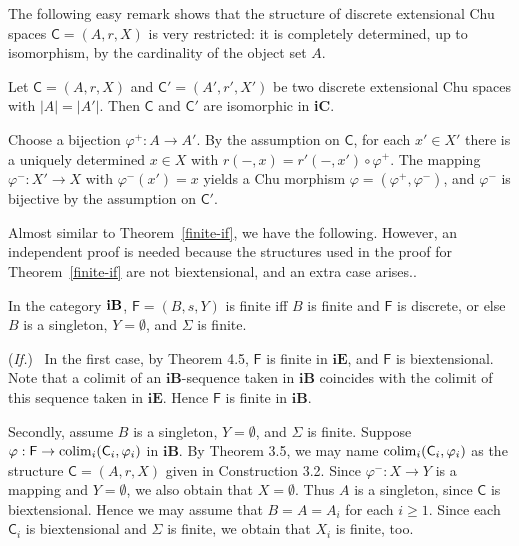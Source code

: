 \documentclass{LMCS}
\let\pf\proof
\let\epf\endproof
\begin{document}
The following easy remark shows that the structure of discrete
extensional Chu spaces $\mathsf{C} = (A,r,X)$ is very restricted: it
is completely determined,  up to isomorphism, by the cardinality of the
object set $A$. 

\begin{rem}\label{rem:complext-iso}
  Let $\mathsf{C} = (A,r,X)$ and $\mathsf{C}'=(A',r',X')$ be two
  discrete extensional Chu spaces with $|A|=|A'|$. Then $\mathsf{C}$ and
  $\mathsf{C}'$ are isomorphic in {\bf iC}. 
\end{rem}

\pf
Choose a bijection $\varphi^+:A \to A'$. By the assumption on
$\mathsf{C}$, for each $x' \in X'$ there is a uniquely determined $x \in
X$ with $r(-,x) = r'(-,x') \circ \varphi^+$. The mapping $\varphi^-:
X' \to X$ with $\varphi^-(x') = x$ yields a Chu morphism
$\varphi=(\varphi^+, \varphi^-)$, and $\varphi^-$ is bijective by the
assumption on $\mathsf{C}'$. 
\epf

Almost similar to Theorem~\ref{finite-if}, we have the following. 
However, an independent proof is needed because
the structures used in the proof for Theorem~\ref{finite-if}
are not biextensional, and an extra case arises.. 


\begin{thm}\label{finite-if-finite}
   In the category ${\bf iB}$, $\mathsf{F}= (B, s, Y)$ is finite iff $B$
   is finite and $\mathsf{F}$ is discrete, or else $B$ is a singleton, $Y =
   \emptyset$, and $\Sigma$ is finite.
\end{thm}




\pf (\emph{If.}) ~In the first case, by Theorem 4.5, $\mathsf{F}$ is
finite in $\mathbf{iE}$, and $\mathsf{F}$ is biextensional. Note that
a colimit of an $\mathbf{iB}$-sequence taken in $\mathbf{iB}$
coincides with the colimit of this sequence taken in
$\mathbf{iE}$. Hence $\mathsf{F}$ is finite in $\mathbf{iB}$.

Secondly, assume $B$ is a singleton, $Y = \emptyset$, and $\Sigma$ is
finite.  Suppose $\varphi: \mathsf{F} \rightarrow {\rm
co}\!\lim_{i}(\mathsf{C}_i, \varphi_i)$ in $\mathbf{iB}$.  By Theorem
3.5, we may name $ {\rm co}\!\lim_{i}(\mathsf{C}_i, \varphi_i)$ as the
structure $\mathsf{C} = (A,r,X)$ given in Construction 3.2. Since
$\varphi^-: X \to Y$ is a mapping and $Y = \emptyset$, we also obtain
that $X = \emptyset$. Thus $A$ is a singleton, since $\mathsf{C}$ is
biextensional. Hence we may assume that $B = A = A_i$ for each $i \geq
1$.  Since each $\mathsf{C}_i$ is biextensional and $\Sigma$ is finite, we
obtain that $X_i$ is finite, too.
\end{document}
